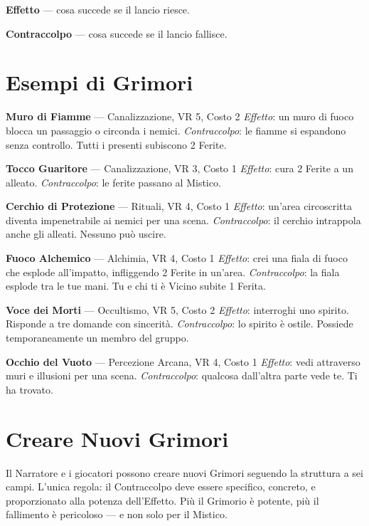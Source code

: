 \documentclass[10pt,a4paper]{article}
\begin{document}
\textbf{Effetto} — cosa succede se il lancio riesce.


\textbf{Contraccolpo} — cosa succede se il lancio fallisce.


\section*{Esempi di Grimori}

\textbf{Muro di Fiamme} — Canalizzazione, VR 5, Costo 2 \textit{Effetto}: un muro di fuoco blocca un passaggio o circonda i nemici. \textit{Contraccolpo}: le fiamme si espandono senza controllo. Tutti i presenti subiscono 2 Ferite.


\textbf{Tocco Guaritore} — Canalizzazione, VR 3, Costo 1 \textit{Effetto}: cura 2 Ferite a un alleato. \textit{Contraccolpo}: le ferite passano al Mistico.


\textbf{Cerchio di Protezione} — Rituali, VR 4, Costo 1 \textit{Effetto}: un'area circoscritta diventa impenetrabile ai nemici per una scena. \textit{Contraccolpo}: il cerchio intrappola anche gli alleati. Nessuno può uscire.


\textbf{Fuoco Alchemico} — Alchimia, VR 4, Costo 1 \textit{Effetto}: crei una fiala di fuoco che esplode all'impatto, infliggendo 2 Ferite in un'area. \textit{Contraccolpo}: la fiala esplode tra le tue mani. Tu e chi ti è Vicino subite 1 Ferita.


\textbf{Voce dei Morti} — Occultismo, VR 5, Costo 2 \textit{Effetto}: interroghi uno spirito. Risponde a tre domande con sincerità. \textit{Contraccolpo}: lo spirito è ostile. Possiede temporaneamente un membro del gruppo.


\textbf{Occhio del Vuoto} — Percezione Arcana, VR 4, Costo 1 \textit{Effetto}: vedi attraverso muri e illusioni per una scena. \textit{Contraccolpo}: qualcosa dall'altra parte vede te. Ti ha trovato.


\section*{Creare Nuovi Grimori}

Il Narratore e i giocatori possono creare nuovi Grimori seguendo la struttura a sei campi. L'unica regola: il Contraccolpo deve essere specifico, concreto, e proporzionato alla potenza dell'Effetto. Più il Grimorio è potente, più il fallimento è pericoloso — e non solo per il Mistico.


\end{document}
